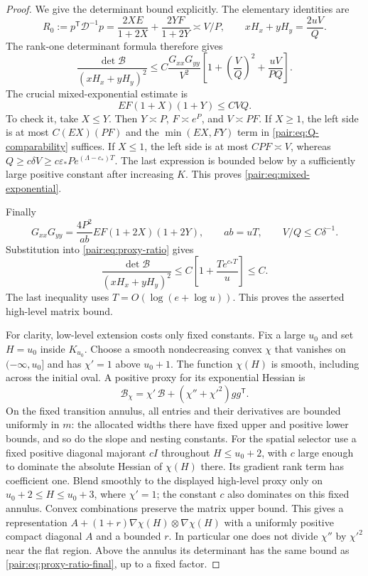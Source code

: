 \documentclass[11pt]{article}
\numberwithin{equation}{section}
\begin{document}
\begin{proof}
We give the determinant bound explicitly. The elementary identities are
\[
 R_0:=p^{\mathsf T}\mathcal D^{-1}p
 =\frac{2XE}{1+2X}+\frac{2YF}{1+2Y}\asymp V/P,
 \qquad xH_x+yH_y=\frac{2uV}{Q}.
\]
The rank-one determinant formula therefore gives
\begin{equation}\label{pair:eq:proxy-ratio}
 \frac{\det\mathcal B}{(xH_x+yH_y)^2}
 \le C\frac{G_{xx}G_{yy}}{V^2}
       \left[1+\left(\frac VQ\right)^2+\frac{uV}{PQ}\right].
\end{equation}
The crucial mixed-exponential estimate is
\begin{equation}\label{pair:eq:mixed-exponential}
 EF(1+X)(1+Y)\le C VQ.
\end{equation}
To check it, take $X\le Y$. Then $Y\asymp P$, $F\asymp e^P$, and
$V\asymp PF$. If $X\ge1$, the left side is at most
$C(EX)(PF)$ and the $\min(EX,FY)$ term in
\eqref{pair:eq:Q-comparability} suffices. If $X\le1$, the left side is
at most $CPF\asymp V$, whereas
$Q\ge c\delta V\ge c\varepsilon_*Pe^{(\Lambda-c_*)T}$.
The last expression is bounded below by a sufficiently large positive
constant after increasing $K$. This proves
\eqref{pair:eq:mixed-exponential}.

Finally
\[
 G_{xx}G_{yy}
 =\frac{4P^2}{ab}EF(1+2X)(1+2Y),\qquad ab=uT,
 \qquad V/Q\le C\delta^{-1}.
\]
Substitution into \eqref{pair:eq:proxy-ratio} gives
\begin{equation}\label{pair:eq:proxy-ratio-final}
 \frac{\det\mathcal B}{(xH_x+yH_y)^2}
 \le C\left[1+\frac{T e^{c_*T}}u\right]\le C.
\end{equation}
The last inequality uses $T=O(\log(e+\log u))$. This proves the asserted
high-level matrix bound.

For clarity, low-level extension costs only fixed constants. Fix a large
$u_0$ and set $H=u_0$ inside $K_{u_0}$. Choose a smooth nondecreasing
convex $\chi$ that vanishes on $(-\infty,u_0]$ and has $\chi'=1$
above $u_0+1$. The function $\chi(H)$ is smooth, including across the
initial oval. A positive proxy for its exponential Hessian is
\[
 \mathcal B_\chi
 =\chi'\,\mathcal B+(\chi''+\chi'^2)gg^{\mathsf T}.
\]
On the fixed transition annulus, all entries and their derivatives are
bounded uniformly in $m$: the allocated widths there have fixed upper
and positive lower bounds, and so do the slope and nesting constants.
For the spatial selector use a fixed positive diagonal majorant $cI$
throughout $H\le u_0+2$, with $c$ large enough to dominate the absolute
Hessian of $\chi(H)$ there. Its gradient rank term has coefficient one.
Blend smoothly to the displayed high-level proxy only on
$u_0+2\le H\le u_0+3$, where $\chi'=1$; the constant $c$ also dominates
on this fixed annulus. Convex combinations preserve the matrix upper
bound. This gives a representation $A+(1+r)\nabla\chi(H)\otimes
\nabla\chi(H)$ with a uniformly positive compact diagonal $A$ and a
bounded $r$. In particular one does not divide $\chi''$ by $\chi'^2$
near the flat region. Above the annulus its determinant has the same
bound as \eqref{pair:eq:proxy-ratio-final}, up to a fixed factor.


\end{proof}
\end{document}
